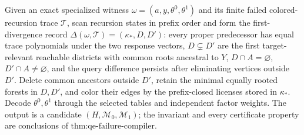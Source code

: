 Given an exact specialized witness \(\omega=(a,y,\theta^0,\theta^1)\) and its finite failed colored-recursion trace \(\mathcal T\), scan recursion states in prefix order and form the first-divergence record \(\Delta(\omega,\mathcal T)=(\kappa_*,D,D')\): every proper predecessor has equal trace polynomials under the two response vectors, \(D\subsetneq D'\) are the first target-relevant reachable districts with common roots ancestral to \(Y\), \(D\cap A=\varnothing\), \(D'\cap A\neq\varnothing\), and the query difference persists after eliminating vertices outside \(D'\). Delete common ancestors outside \(D'\), retain the minimal equally rooted forests in \(D,D'\), and color their edges by the prefix-closed licenses stored in \(\kappa_*\). Decode \(\theta^0,\theta^1\) through the selected tables and independent factor weights. The output is a candidate \((H,\mathcal M_0,\mathcal M_1)\); the invariant and every certificate property are conclusions of \(\text{thm:qe-failure-compiler}\).